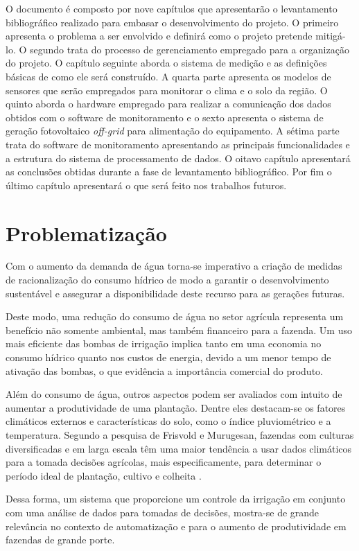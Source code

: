O documento é composto por nove capítulos que apresentarão o levantamento bibliográfico realizado para embasar o desenvolvimento do projeto. O primeiro apresenta o problema a ser envolvido e definirá como o projeto pretende mitigá-lo. O segundo trata do processo de gerenciamento empregado para a organização do projeto. O capítulo seguinte aborda o sistema de medição e as definições básicas de como ele será construído. A quarta parte apresenta os modelos de sensores que serão empregados para monitorar o clima e o solo da região. O quinto aborda o hardware empregado para realizar a comunicação dos dados obtidos com o software de monitoramento e o sexto apresenta o sistema de geração fotovoltaico \textit{off-grid} para alimentação do equipamento. A sétima parte trata do software de monitoramento apresentando as principais funcionalidades e a estrutura do sistema de processamento de dados. O oitavo capítulo apresentará as conclusões obtidas durante a fase de levantamento bibliográfico. Por fim o último capítulo apresentará o que será feito nos trabalhos futuros.

\chapter{Problematização}

Com o aumento da demanda de água torna-se imperativo a criação de medidas de racionalização do consumo hídrico de modo a garantir o desenvolvimento sustentável e assegurar a disponibilidade deste recurso para as gerações futuras.

Deste modo, uma redução do consumo de água no setor agrícula representa um benefício não somente ambiental, mas também financeiro para a fazenda. Um uso mais eficiente das bombas de irrigação implica tanto em uma economia no consumo hídrico quanto nos custos de energia, devido a um menor tempo de ativação das bombas, o que evidência a importância comercial do produto.

Além do consumo de água, outros aspectos podem ser avaliados com intuito de aumentar a produtividade de uma plantação. Dentre eles destacam-se os fatores climáticos externos e características do solo, como o índice pluviométrico e a temperatura. Segundo a pesquisa de Frisvold e Murugesan, fazendas com culturas diversificadas e em larga escala têm uma maior tendência a usar dados climáticos para a tomada decisões agrícolas, mais especificamente, para determinar o período ideal de plantação, cultivo e colheita \cite{bib_06}. 

Dessa forma, um sistema que proporcione um controle da irrigação em conjunto com uma análise de dados para tomadas de decisões, mostra-se de grande relevância no contexto de automatização e para o aumento de produtividade em fazendas de grande porte. 

